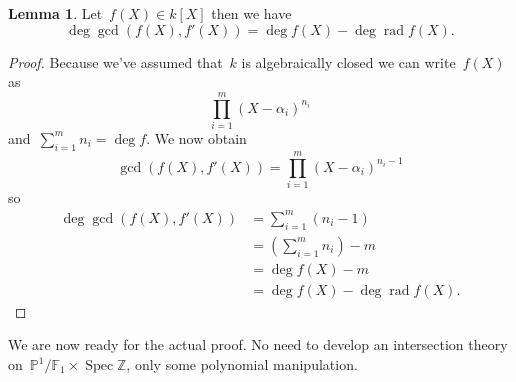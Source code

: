 \documentclass[11pt, a4paper, openany, oneside, article]{memoir}
\theoremstyle{definition}
\newtheorem{lemma}[theorem]{Lemma}
\DeclareMathOperator\rad{rad}
\begin{document}
\begin{lemma}
  \label{lemma:number-of-roots}
  Let~$f(X)\in k[X]$ then we have
  \begin{equation}
    \deg\gcd(f(X),f'(X))=\deg f(X)-\deg\rad f(X).
  \end{equation}

  \begin{proof}
    Because we've assumed that~$k$ is algebraically closed we can write~$f(X)$ as
    \begin{equation}
      \prod_{i=1}^m(X-\alpha_i)^{n_i}
    \end{equation}
    and~$\sum_{i=1}^mn_i=\deg f$. We now obtain
    \begin{equation}
      \gcd(f(X),f'(X))=\prod_{i=1}^m(X-\alpha_i)^{n_i-1}
    \end{equation}
    so
    \begin{equation}
      \begin{aligned}
        \deg\gcd(f(X),f'(X))&=\sum_{i=1}^m(n_i-1) \\
        &=\left( \sum_{i=1}^mn_i \right)-m \\
        &=\deg f(X)-m \\
        &=\deg f(X)-\deg\rad f(X).
      \end{aligned}
    \end{equation}
  \end{proof}
\end{lemma}

We are now ready for the actual proof. No need to develop an intersection theory on~$\mathbb{P}^1/\mathbb{F}_1\times\operatorname{Spec}\mathbb{Z}$, only some polynomial manipulation.
\end{document}

